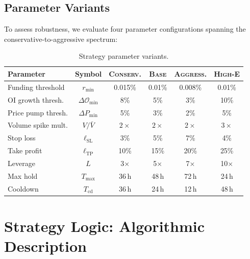 \documentclass[11pt,a4paper]{article}
\newcommand{\OI}{\mathcal{O}}
\begin{document}
\subsection{Parameter Variants}

To assess robustness, we evaluate four parameter configurations spanning 
the conservative-to-aggressive spectrum:

\begin{table}[H]
\centering
\caption{Strategy parameter variants.}
\label{tab:variants}
\renewcommand{\arraystretch}{1.2}
\begin{tabular}{lccccc}
\toprule
Parameter & Symbol & \textsc{Conserv.} & \textsc{Base} & \textsc{Aggress.} & \textsc{High-E} \\
\midrule
Funding threshold & $r_{\min}$ & 0.015\% & 0.01\% & 0.008\% & 0.01\% \\
OI growth thresh. & $\Delta\OI_{\min}$ & 8\% & 5\% & 3\% & 10\% \\
Price pump thresh. & $\Delta P_{\min}$ & 5\% & 3\% & 2\% & 5\% \\
Volume spike mult. & $V/\bar{V}$ & $2\times$ & $2\times$ & $2\times$ & $3\times$ \\
Stop loss & $\ell_{\mathrm{SL}}$ & 3\% & 5\% & 7\% & 4\% \\
Take profit & $\ell_{\mathrm{TP}}$ & 10\% & 15\% & 20\% & 25\% \\
Leverage & $L$ & 3$\times$ & 5$\times$ & 7$\times$ & 10$\times$ \\
Max hold & $T_{\max}$ & 36\,h & 48\,h & 72\,h & 24\,h \\
Cooldown & $T_{\mathrm{cd}}$ & 36\,h & 24\,h & 12\,h & 48\,h \\
\bottomrule
\end{tabular}
\end{table}


\section{Strategy Logic: Algorithmic Description}
\label{sec:algorithm}
\end{document}
